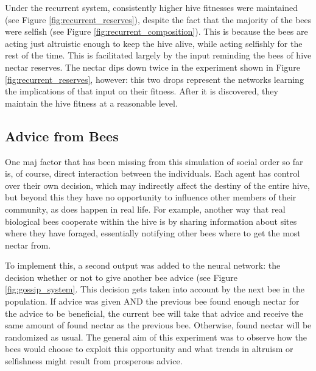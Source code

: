 \documentclass[11pt]{article}
\begin{document}
			Under the recurrent system, consistently higher hive fitnesses were maintained (see Figure \ref{fig:recurrent_reserves}), despite the fact that the majority of the bees were selfish (see Figure \ref{fig:recurrent_composition}). This is because the bees are acting just altruistic enough to keep the hive alive, while acting selfishly for the rest of the time. This is facilitated largely by the input reminding the bees of hive nectar reserves. The nectar dips down twice in the experiment shown in Figure \ref{fig:recurrent_reserves}, however: this two drops represent the networks learning the implications of that input on their fitness. After it is discovered, they maintain the hive fitness at a reasonable level.

		\FloatBarrier
		\subsection{Advice from Bees} %
		\label{sub:advice_from_bees}

			One maj	\FloatBarrieror factor that has been missing from this simulation of social order so far is, of course, direct interaction between the individuals. Each agent has control over their own decision, which may indirectly affect the destiny of the entire hive, but beyond this they have no opportunity to influence other members of their community, as does happen in real life. For example, another way that real biological bees cooperate within the hive is by sharing information about sites where they have foraged, essentially notifying other bees where to get the most nectar from. 

			To implement this, a second output was added to the neural network: the decision whether or not to give another bee advice (see Figure \ref{fig:gossip_system}. This decision gets taken into account by the next bee in the population. If advice was given AND the previous bee found enough nectar for the advice to be beneficial, the current bee will take that advice and receive the same amount of found nectar as the previous bee. Otherwise, found nectar will be randomized as usual. The general aim of this experiment was to observe how the bees would choose to exploit this opportunity and what trends in altruism or selfishness might result from prosperous advice.
\end{document}
